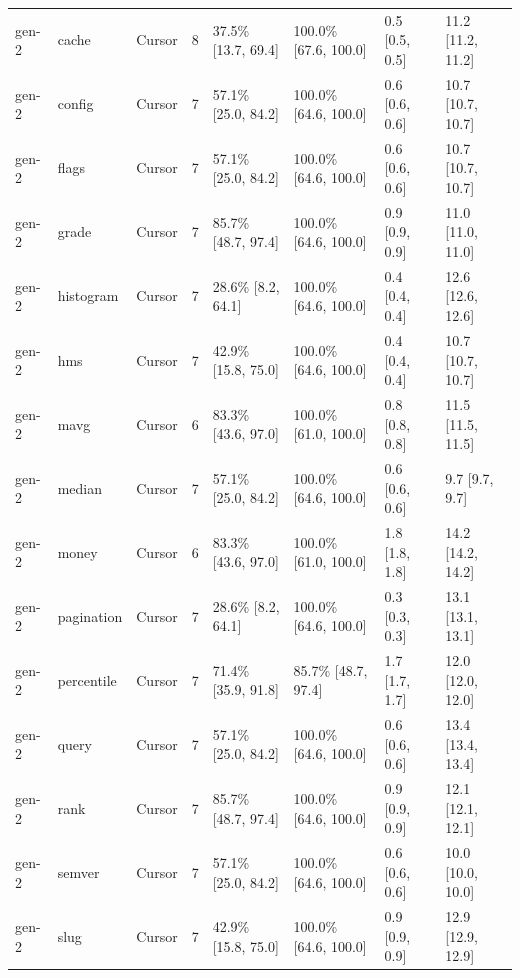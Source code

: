 \begin{tabular}{llllllll}
gen-2 & cache & Cursor & 8 & 37.5\% [13.7, 69.4] & 100.0\% [67.6, 100.0] & 0.5 [0.5, 0.5] & 11.2 [11.2, 11.2] \\
gen-2 & config & Cursor & 7 & 57.1\% [25.0, 84.2] & 100.0\% [64.6, 100.0] & 0.6 [0.6, 0.6] & 10.7 [10.7, 10.7] \\
gen-2 & flags & Cursor & 7 & 57.1\% [25.0, 84.2] & 100.0\% [64.6, 100.0] & 0.6 [0.6, 0.6] & 10.7 [10.7, 10.7] \\
gen-2 & grade & Cursor & 7 & 85.7\% [48.7, 97.4] & 100.0\% [64.6, 100.0] & 0.9 [0.9, 0.9] & 11.0 [11.0, 11.0] \\
gen-2 & histogram & Cursor & 7 & 28.6\% [8.2, 64.1] & 100.0\% [64.6, 100.0] & 0.4 [0.4, 0.4] & 12.6 [12.6, 12.6] \\
gen-2 & hms & Cursor & 7 & 42.9\% [15.8, 75.0] & 100.0\% [64.6, 100.0] & 0.4 [0.4, 0.4] & 10.7 [10.7, 10.7] \\
gen-2 & mavg & Cursor & 6 & 83.3\% [43.6, 97.0] & 100.0\% [61.0, 100.0] & 0.8 [0.8, 0.8] & 11.5 [11.5, 11.5] \\
gen-2 & median & Cursor & 7 & 57.1\% [25.0, 84.2] & 100.0\% [64.6, 100.0] & 0.6 [0.6, 0.6] & 9.7 [9.7, 9.7] \\
gen-2 & money & Cursor & 6 & 83.3\% [43.6, 97.0] & 100.0\% [61.0, 100.0] & 1.8 [1.8, 1.8] & 14.2 [14.2, 14.2] \\
gen-2 & pagination & Cursor & 7 & 28.6\% [8.2, 64.1] & 100.0\% [64.6, 100.0] & 0.3 [0.3, 0.3] & 13.1 [13.1, 13.1] \\
gen-2 & percentile & Cursor & 7 & 71.4\% [35.9, 91.8] & 85.7\% [48.7, 97.4] & 1.7 [1.7, 1.7] & 12.0 [12.0, 12.0] \\
gen-2 & query & Cursor & 7 & 57.1\% [25.0, 84.2] & 100.0\% [64.6, 100.0] & 0.6 [0.6, 0.6] & 13.4 [13.4, 13.4] \\
gen-2 & rank & Cursor & 7 & 85.7\% [48.7, 97.4] & 100.0\% [64.6, 100.0] & 0.9 [0.9, 0.9] & 12.1 [12.1, 12.1] \\
gen-2 & semver & Cursor & 7 & 57.1\% [25.0, 84.2] & 100.0\% [64.6, 100.0] & 0.6 [0.6, 0.6] & 10.0 [10.0, 10.0] \\
gen-2 & slug & Cursor & 7 & 42.9\% [15.8, 75.0] & 100.0\% [64.6, 100.0] & 0.9 [0.9, 0.9] & 12.9 [12.9, 12.9] \\
\bottomrule
\end{tabular}
